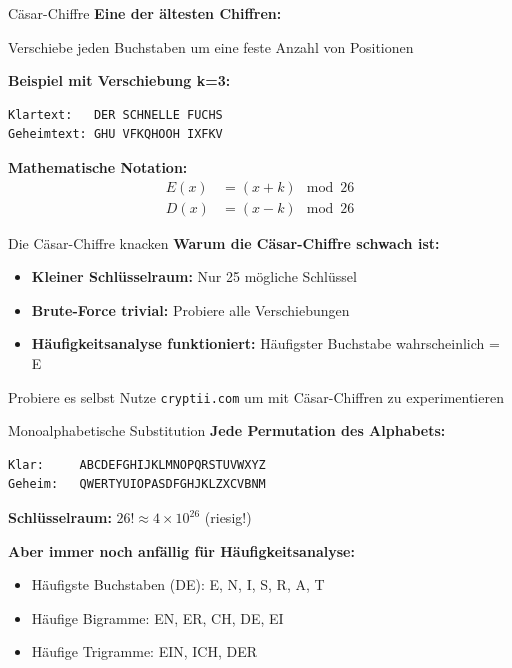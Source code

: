 \documentclass[handout]{beamer}
\begin{document}
\begin{frame}[fragile]{Cäsar-Chiffre}
\textbf{Eine der ältesten Chiffren:}

Verschiebe jeden Buchstaben um eine feste Anzahl von Positionen

\vspace{0.3cm}
\textbf{Beispiel mit Verschiebung k=3:}
\begin{verbatim}
Klartext:   DER SCHNELLE FUCHS
Geheimtext: GHU VFKQHOOH IXFKV
\end{verbatim}

\vspace{0.3cm}
\textbf{Mathematische Notation:}
\begin{align*}
E(x) &= (x + k) \mod 26 \\
D(x) &= (x - k) \mod 26
\end{align*}

\end{frame}

\begin{frame}{Die Cäsar-Chiffre knacken}
\textbf{Warum die Cäsar-Chiffre schwach ist:}

\begin{itemize}
    \item \textbf{Kleiner Schlüsselraum:} Nur 25 mögliche Schlüssel
    \item \textbf{Brute-Force trivial:} Probiere alle Verschiebungen
    \item \textbf{Häufigkeitsanalyse funktioniert:} Häufigster Buchstabe wahrscheinlich = E
\end{itemize}

\vspace{0.5cm}
\begin{exampleblock}{Probiere es selbst}
Nutze \texttt{cryptii.com} um mit Cäsar-Chiffren zu experimentieren
\end{exampleblock}

\end{frame}

\begin{frame}[fragile]{Monoalphabetische Substitution}
\textbf{Jede Permutation des Alphabets:}

\begin{verbatim}
Klar:     ABCDEFGHIJKLMNOPQRSTUVWXYZ
Geheim:   QWERTYUIOPASDFGHJKLZXCVBNM
\end{verbatim}

\textbf{Schlüsselraum:} $26! \approx 4 \times 10^{26}$ (riesig!)

\vspace{0.5cm}
\textbf{Aber immer noch anfällig für Häufigkeitsanalyse:}
\begin{itemize}
    \item Häufigste Buchstaben (DE): E, N, I, S, R, A, T
    \item Häufige Bigramme: EN, ER, CH, DE, EI
    \item Häufige Trigramme: EIN, ICH, DER
\end{itemize}

\end{frame}
\end{document}
